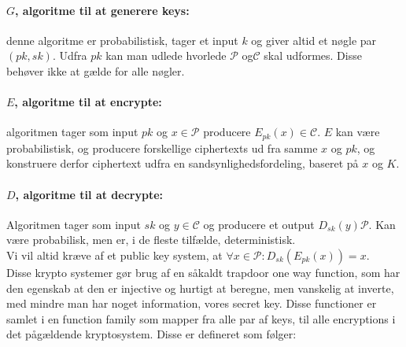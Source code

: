 \documentclass[paper=a4, fontsize=11pt]{scrartcl} %
\numberwithin{equation}{section} %
\numberwithin{figure}{section} %
\numberwithin{table}{section} %
\begin{document}
 	\paragraph{\textbf{$G$, algoritme til at generere keys:}} denne algoritme er probabilistisk, tager et input $k$ og giver altid et nøgle par $(pk,sk)$. Udfra $pk$ kan man udlede hvorlede $\mathcal{P}$ og$\mathcal{C}$ skal udformes. Disse behøver ikke at gælde for alle nøgler.
 	\paragraph{\textbf{$E$, algoritme til at encrypte:}} algoritmen tager som input $pk$ og $x\in\mathcal{P}$ producere $E_{pk}(x)\in\mathcal{C}$. $E$ kan være probabilistisk, og producere forskellige ciphertexts ud fra samme $x$ og $pk$, og konstruere derfor ciphertext udfra en sandsynlighedsfordeling, baseret på $x$ og $K$.
 	\paragraph{\textbf{$D$, algoritme til at decrypte:}} Algoritmen tager som input $sk$ og $y\in\mathcal{C}$ og producere et output $D_{sk}(y)\mathcal{P}$. Kan være probabilisk, men er, i de fleste tilfælde, deterministisk. \\
 	
 	Vi vil altid kræve af et public key system, at $\forall x\in\mathcal{P}:D_{sk}(E_{pk}(x))=x$.\\
 	
 	Disse krypto systemer gør brug af en såkaldt trapdoor one way function, som har den egenskab at den er injective og hurtigt at beregne, men vanskelig at inverte, med mindre man har noget information, vores secret key. Disse functioner er samlet i en function family som mapper fra alle par af keys, til alle encryptions i det pågældende kryptosystem. Disse er defineret som følger:
 	
\end{document}
